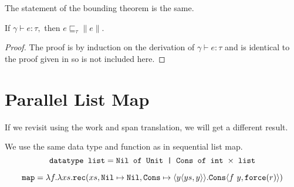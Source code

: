 %
The statement of the bounding theorem is the same.
%
\begin{theorem}
  If $\gamma \vdash e : \tau, $ then $e \sqsubseteq_\tau \|e\|$.
\end{theorem}
\begin{proof}
  The proof is by induction on the derivation of $\gamma \vdash e : \tau$ and
  is identical to the proof given in \citet{Danner2015} so is not included
  here.
\end{proof}

\section{Parallel List Map}
If we revisit  using the work and span translation, we will get a different result.


We use the same data type  and  function as in sequential list map.
\begin{equation*}
  \texttt{datatype list} = \texttt{Nil of Unit | Cons of int $\times$ list}
\end{equation*}

\begin{equation*}
  \texttt{map} = \lambda f. \lambda xs . \texttt{rec}(xs, \texttt{Nil} \mapsto \texttt{Nil}, \texttt{Cons} \mapsto \langle y \langle ys, y \rangle\rangle. \texttt{Cons}\langle f\ y, \texttt{force}(r)\rangle)
\end{equation*}

